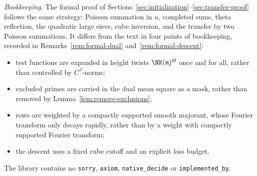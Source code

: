\medskip
\emph{Bookkeeping.} The formal proof of
Sections~\ref{sec:initialization}--\ref{sec:transfer-proof} follows the same strategy: Poisson
summation in $u$, completed sums, theta reflection, the quadratic large sieve, cube inversion,
and the transfer by two Poisson summations. It differs from the text in four points of
bookkeeping, recorded in Remarks~\ref{rem:formal-dual} and~\ref{rem:formal-descent}:
\begin{itemize}
\item test functions are expanded in height twists $\NK(\mathfrak n)^{\mathrm i\theta}$ once and
for all, rather than controlled by $C^J$-norms;
\item excluded primes are carried in the dual mean square as a mask, rather than removed by
Lemma~\ref{lem:remove-exclusions};
\item rows are weighted by a compactly supported smooth majorant, whose Fourier transform only
decays rapidly, rather than by a weight with compactly supported Fourier transform;
\item the descent uses a fixed cube cutoff and an explicit loss budget.
\end{itemize}

The library contains no \texttt{sorry}, \texttt{axiom}, \texttt{native\_decide} or
\texttt{implemented\_by}.
